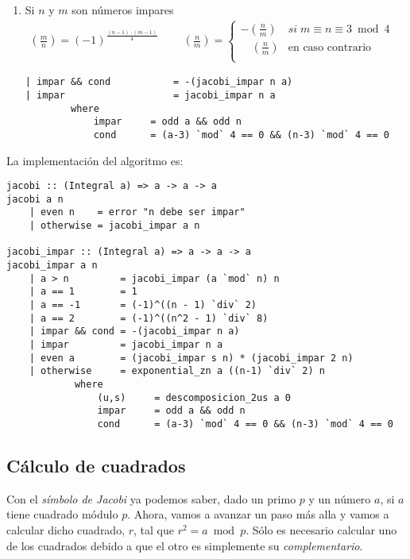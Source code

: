 \documentclass[10pt,spanish]{article}
\begin{document}
\begin{enumerate}[1.]
\item Si $n$ y $m$ son números impares
\begin{equation*}
    \begin{aligned}
    \left( \frac{m}{n} \right) = (-1)^{\frac{(n-1)\cdot(m-1)}{4}} \qquad\ \left( \frac{n}{m} \right) = \begin{cases}
        - \left( \frac{n}{m} \right) & si \;m \equiv n \equiv 3 \bmod 4 \\
        \quad\left( \frac{n}{m} \right) & \text{en caso contrario}\\
        \end{cases}
    \end{aligned}
    \phantom{\hspace{18cm}}
\end{equation*}

\begin{verbatim}
| impar && cond           = -(jacobi_impar n a)
| impar                   = jacobi_impar n a
        where
            impar     = odd a && odd n 
            cond      = (a-3) `mod` 4 == 0 && (n-3) `mod` 4 == 0
\end{verbatim}
\end{enumerate}

La implementación del algoritmo es:

\begin{verbatim}
jacobi :: (Integral a) => a -> a -> a
jacobi a n
    | even n    = error "n debe ser impar"
    | otherwise = jacobi_impar a n

jacobi_impar :: (Integral a) => a -> a -> a
jacobi_impar a n
    | a > n         = jacobi_impar (a `mod` n) n
    | a == 1        = 1
    | a == -1       = (-1)^((n - 1) `div` 2)
    | a == 2        = (-1)^((n^2 - 1) `div` 8)
    | impar && cond = -(jacobi_impar n a)
    | impar         = jacobi_impar n a
    | even a        = (jacobi_impar s n) * (jacobi_impar 2 n)
    | otherwise     = exponential_zn a ((n-1) `div` 2) n
            where
                (u,s)     = descomposicion_2us a 0
                impar     = odd a && odd n 
                cond      = (a-3) `mod` 4 == 0 && (n-3) `mod` 4 == 0

\end{verbatim}

\subsection{\textcolor{rojo}Cálculo de cuadrados}
Con el \textit{\textcolor{rojo}{símbolo de Jacobi}} ya podemos saber, dado un primo $p$ y un número $a$, si $a$ tiene cuadrado módulo $p$. Ahora, vamos a avanzar un paso más alla y vamos a calcular dicho cuadrado, $r$, tal que $r^2 = a \bmod p$. Sólo es necesario calcular uno de los cuadrados debido a que el otro es simplemente su \textit{\textcolor{rojo}{complementario}}.
\end{document}
